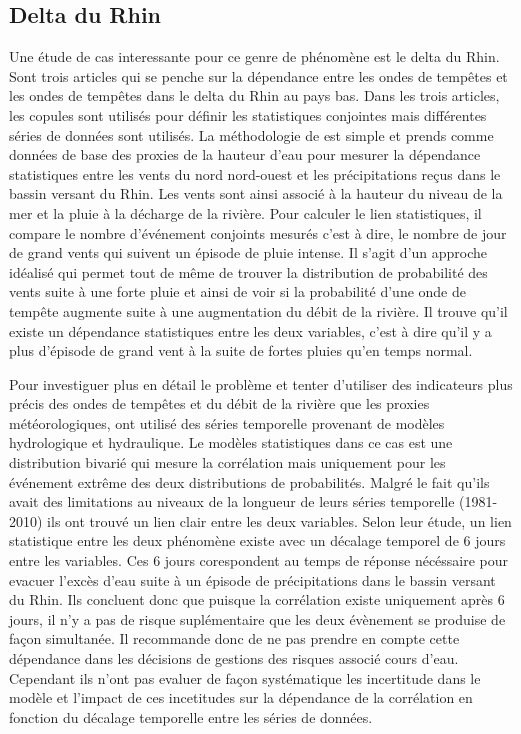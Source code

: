 \documentclass[12pt]{article}   %
\begin{document}
    \subsection{Delta du Rhin}
    Une étude de cas interessante pour ce genre de phénomène est le delta du Rhin. \cite{Kew2013, Klerk2015,Khanal2019} Sont trois articles qui se penche sur la dépendance entre les ondes de tempêtes et les ondes de tempêtes dans le delta du Rhin au pays bas. Dans les trois articles, les copules sont utilisés pour définir les statistiques conjointes mais différentes séries de données sont utilisés.  La méthodologie de \cite{Kew2013} est simple et prends comme données de base des proxies de la hauteur d'eau pour mesurer la dépendance statistiques entre les vents du nord nord-ouest et les précipitations reçus dans le bassin versant du Rhin. Les vents sont ainsi associé à la hauteur du niveau de la mer et la pluie à la décharge de la rivière. Pour calculer le lien statistiques, il compare le nombre d'événement conjoints mesurés c'est à dire, le nombre de jour de grand vents qui suivent un épisode de pluie intense. Il s'agit d'un approche idéalisé qui permet tout de même de trouver la distribution de probabilité des vents suite à une forte pluie et ainsi de voir si la probabilité d'une onde de tempête augmente suite à une augmentation du débit de la rivière. Il trouve qu'il existe un dépendance statistiques entre les deux variables, c'est à dire qu'il y a plus d'épisode de grand vent à la suite de  fortes pluies qu'en temps normal.
    \par
    Pour investiguer plus en détail le problème et tenter d'utiliser des indicateurs plus précis des ondes de tempêtes et du débit de la rivière que les proxies météorologiques, \cite{Klerk2015} ont utilisé des séries temporelle provenant de modèles hydrologique et hydraulique. Le modèles statistiques dans ce cas est une distribution bivarié qui mesure la corrélation mais uniquement pour les événement extrême des deux distributions de probabilités. Malgré le fait qu'ils avait des limitations au niveaux de la longueur de leurs séries temporelle (1981-2010) ils ont trouvé un lien clair entre les deux variables. Selon leur étude, un lien statistique entre les deux phénomène existe avec un décalage temporel de 6 jours entre les variables.  Ces 6 jours corespondent au temps de réponse nécéssaire pour evacuer l'excès d'eau suite à un épisode de précipitations dans le bassin versant du Rhin. Ils concluent donc que puisque la corrélation existe uniquement après 6 jours, il n'y a pas de risque suplémentaire que les deux évènement se produise de façon simultanée. Il recommande donc de ne pas prendre en compte cette dépendance dans les décisions de gestions des risques associé cours d'eau. Cependant ils n'ont pas evaluer de façon systématique les incertitude dans le modèle et l'impact de ces incetitudes sur la dépendance de la corrélation en fonction du décalage temporelle entre les séries de données.
\end{document}
